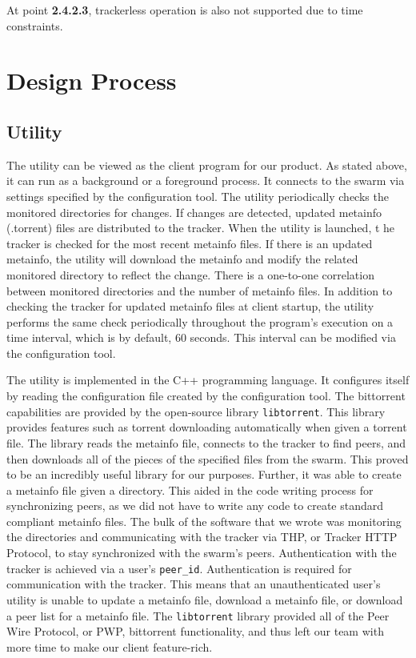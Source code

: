 \documentclass[12 pt]{article}
\begin{document}
	At point \textbf{2.4.2.3}, trackerless operation is also not supported due to time constraints.
	
	\section{Design Process}
	
	\subsection{Utility}
	
	The utility can be viewed as the client program for our product. As stated above, it can run as a background or a foreground process. It connects to the swarm via settings specified by the configuration tool. The utility periodically checks the monitored directories for changes. If changes are detected, updated metainfo (.torrent) files are distributed to the tracker. When the utility is launched, t he tracker is checked for the most recent metainfo files. If there is an updated metainfo, the utility will download the metainfo and modify the related monitored directory to reflect the change. There is a one-to-one correlation between monitored directories and the number of metainfo files. In addition to checking the tracker for updated metainfo files at client startup, the utility performs the same check periodically throughout the program's execution on a time interval, which is by default, 60 seconds. This interval can be modified via the configuration tool.
	
	The utility is implemented in the C++ programming language. It configures itself by reading the configuration file created by the configuration tool. The bittorrent capabilities are provided by the open-source library \texttt{libtorrent}. This library provides features such as torrent downloading automatically when given a torrent file. The library reads the metainfo file, connects to the tracker to find peers, and then downloads all of the pieces of the specified files from the swarm. This proved to be an incredibly useful library for our purposes. Further, it was able to create a metainfo file given a directory. This aided in the code writing process for synchronizing peers, as we did not have to write any code to create standard compliant metainfo files. The bulk of the software that we wrote was monitoring the directories and communicating with the tracker via THP, or Tracker HTTP Protocol, to stay synchronized with the swarm's peers. Authentication with the tracker is achieved via a user's \texttt{peer\_id}. Authentication is required for communication with the tracker. This means that an unauthenticated user's utility is unable to update a metainfo file, download a metainfo file, or download a peer list for a metainfo file. The \texttt{libtorrent} library provided all of the Peer Wire Protocol, or PWP, bittorrent functionality, and thus left our team with more time to make our client feature-rich.
	
\end{document}

